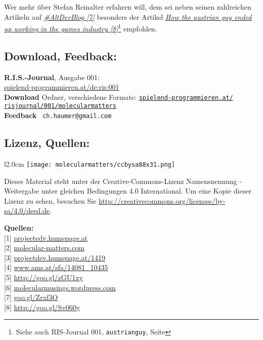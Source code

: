 Wer mehr über Stefan Reinalter erfahren will, dem sei neben seinen zahlreichen Artikeln auf \href{http://www.altdevblogaday.com/author/stefan-reinalter/}{\textit{\#AltDevBlog [7]}} besonders der Artikel \href{http://www.altdevblogaday.com/2011/09/27/how-the-austrian-guy-ended-up-working-in-the-games-industry/}{\textit{How the austrian guy ended up working in the games industry [8]}}\footnote{Siehe auch RIS-Journal 001, \texttt{austrianguy}, Seite \pageref{austrianguy}} empfohlen.

\subsection*{Download, Feedback:}
\textbf{R.I.S.-Journal}, Ausgabe 001: \\
\href{http://spielend-programmieren.at/de:ris:001}{spielend-programmieren.at/de:ris:001}\\
\textbf{Download} Ordner, verschiedene Formate: \href{http://spielend-programmieren.at/risjournal/001/molecularmatters}{\texttt{spielend-programmieren.at/\\risjournal/001/molecularmatters}} \\
\textbf{Feedback} \Letter\ \texttt{ch.haumer@gmail.com} \\

\subsection*{Lizenz, Quellen:}

\begin{wrapfigure}{l}{2.0cm}
\texttt{[image: molecularmatters/ccbysa88x31.png]}
\end{wrapfigure}
Dieses Material steht unter der Creative-Commons-Lizenz Namensnennung - Weitergabe unter gleichen Bedingungen 4.0 International. Um eine Kopie dieser Lizenz zu sehen, besuchen Sie \url{http://creativecommons.org/licenses/by-sa/4.0/deed.de}.

\textbf{Quellen:} \\
{[}1{]} \href{http://projectdev.humepage.at/}{projectedv.humepage.at} \\
{[}2{]} \href{http://www.molecular-matters.com/}{molecular-matters.com} \\
{[}3{]} \href{http://projectdev.humepage.at/1419}{projectdev.humepage.at/1419} \\
{[}4{]} \href{http://www.ams.at/sfa/14081_10435.html}{www.ams.at/sfa/14081\_10435} \\
{[}5{]} \href{https://www.gruenderservice.at/Content.Node/gruenden/Jungunternehmerfoerderungen.html}{http://goo.gl/zGU1xy} \\
{[}6{]} \href{http://molecularmusings.wordpress.com/}{molecularmusings.wordpress.com} \\
{[}7{]} \href{http://www.altdevblogaday.com/author/stefan-reinalter/}{goo.gl/Zrxf3O} \\
{[}8{]} \href{http://www.altdevblogaday.com/2011/09/27/how-the-austrian-guy-ended-up-working-in-the-games-industry/}{http://goo.gl/Sv060y} 



